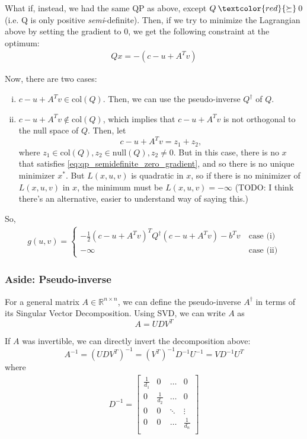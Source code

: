 \documentclass[11pt]{article}
\newcommand{\R}{\mathbb{R}}
\begin{document}
What if, instead, we had the same QP as above, except $Q
\mathbin{\textcolor{red}{\succeq}} 0$ (i.e. Q is only positive
\textit{semi}-definite).  Then, if we try to minimize the Lagrangian above by
setting the gradient to 0, we get the following constraint at the optimum:
\begin{align}
Qx = -(c - u + A^T v) \label{eq:qp_semidefinite_zero_gradient}
\end{align}

Now, there are two cases:
\begin{enumerate}[(i)]
\item $c - u + A^T v \in \text{col}(Q)$. Then, we can use the pseudo-inverse
      $Q^{\dagger}$ of $Q$.
\item $c - u + A^T v \not\in \text{col}(Q)$, which implies that $c - u + A^T v$
      is not orthogonal to the null space of $Q$. Then, let
      \[ c - u + A^T v = z_1 + z_2, \]
      where $z_1 \in \text{col}(Q), z_2 \in \text{null}(Q), z_2 \neq 0$. But
      in this case, there is no $x$ that satisfies
      \cref{eq:qp_semidefinite_zero_gradient}, and so there is no unique
      minimizer $x^*$. But $L(x, u, v)$ is quadratic in $x$, so if there is no
      minimizer of $L(x, u, v)$ in $x$, the minimum must be $L(x, u, v) =
      -\infty$ (TODO: I think there's an alternative, easier to understand way
      of saying this.)
\end{enumerate}

So,
\begin{align*}
g(u, v) = \begin{cases}
-\frac{1}{2} (c - u + A^T v)^T Q^{\dagger} (c - u + A^Tv) - b^T v ~&\text{case (i)} \\
-\infty ~&\text{case (ii)}
\end{cases}
\end{align*}

\subsubsection{Aside: Pseudo-inverse}
For a general matrix $A \in \R^{n\times n}$, we can define the pseudo-inverse
$A^{\dagger}$ in terms of its Singular Vector Decomposition. Using SVD, we can
write $A$ as
\[ A = U D V^T \]

If $A$ was invertible, we can directly invert the decomposition above:
\[ A^{-1} = (U D V^T)^{-1} = (V^T)^{-1} D^{-1} U^{-1} = V D^{-1} U^T \]
where
\begin{align*}
D^{-1} = \begin{bmatrix}
\frac{1}{d_1} & 0 & \dots & 0 \\
0 & \frac{1}{d_2} & \dots & 0 \\
0 & 0 & \ddots & \vdots \\
0 & 0 & \dots & \frac{1}{d_n} \\
\end{bmatrix}
\end{align*}
\end{document}
